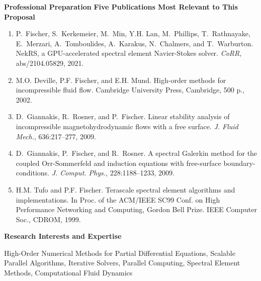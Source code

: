 \documentclass[11pt,letterpaper,english]{article}
\begin{document}
\begin{flushleft} {\bf Professional Preparation}
\vspace{.04in}
{\bf Five Publications Most Relevant to This Proposal}
\vspace{-6pt}
\begin{enumerate} \itemsep1pt \parskip0pt 
\item P.~Fischer, S.~Kerkemeier, M.~Min, Y.H. Lan, M.~Phillips, T.~Rathnayake,
      E.~Merzari, A.~Tomboulides, A.~Karakus, N.~Chalmers, and T.~Warburton.
      Nek{RS}, a {GPU}-accelerated spectral element {Navier-Stokes} solver.
      {\em CoRR}, abs/2104.05829, 2021. \\
\item M.O. Deville, P.F. Fischer, and E.H. Mund. High-order methods for incompressible fluid flow.
      Cambridge University Press, Cambridge, 500 p., 2002. \\
\item D.~Giannakis, R.~Rosner, and P.~Fischer.  Linear stability analysis of
      incompressible magnetohydrodynamic flows with a free surface.  {\em J. Fluid
      Mech.}, 636:217--277, 2009. \\
\item D.~Giannakis, P.~Fischer, and R.~Rosner.  A spectral {Galerkin} method for the
      coupled {Orr-Sommerfeld} and induction equations with free-surface
      boundary-conditions.  {\em J. Comput. Phys.}, 228:1188--1233, 2009. \\
\item H.M. Tufo and P.F. Fischer. Terascale spectral element algorithms and implementations. In Proc.
      of the ACM/IEEE SC99 Conf. on High Performance Networking and Computing, Gordon Bell
      Prize. IEEE Computer Soc., CDROM, 1999. 
\end{enumerate}

\vspace{-6pt}
{\bf Research Interests and Expertise}
{\parindent 16pt

High-Order Numerical Methods for Partial Differential Equations, Scalable Parallel Algorithms, Iterative Solvers, Parallel Computing, Spectral Element Methods, Computational Fluid Dynamics
}


\end{flushleft}
\end{document}
